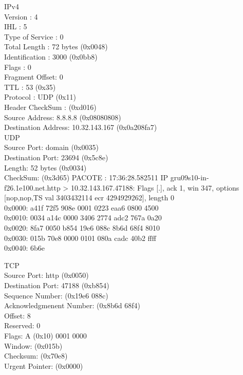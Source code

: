 \documentclass[12pt]{article}
\begin{document}
IPv4 \\
Version : 4 \\
IHL : 5 \\
Type of Service : 0 \\
Total Length : 72 bytes (0x0048) \\
Identification : 3000 (0x0bb8) \\
Flags : 0 \\ 
Fragment Offset: 0 \\
TTL : 53 (0x35) \\
Protocol : UDP (0x11) \\
Header CheckSum : (0xd016) \\
Source Address: 8.8.8.8 (0x08080808) \\ 
Destination Address: 10.32.143.167 (0x0a208fa7) \\

UDP \\
Source Port: domain (0x0035) \\
Destination Port: 23694 (0x5c8e) \\
Length: 52 bytes (0x0034)  \\
CheckSum: (0x3d65) 
 \newpage
PACOTE : 17:36:28.582511 IP gru09s10-in-f26.1e100.net.http > 10.32.143.167.47188: Flags [.], ack 1, win 347, options [nop,nop,TS val 3403432114 ecr 4294929262], length 0 \\
0x0000:  a41f 72f5 908e 0001 0223 eaa6 0800 4500  \\
0x0010:  0034 a14c 0000 3406 2774 adc2 767a 0a20   \\
0x0020:  8fa7 0050 b854 19e6 088c 8b6d 68f4 8010  \\
0x0030:  015b 70e8 0000 0101 080a cadc 40b2 ffff   \\
0x0040:  6b6e  
	
TCP \\ 
Source Port: http (0x0050) \\
Destination Port: 47188 (0xb854) \\
Sequence Number: (0x19e6 088c) \\
Acknowledgmenent Number: (0x8b6d 68f4) \\
Offset: 8 \\
Reserved: 0 \\
Flags: A (0x10) 0001 0000 \\
Window: (0x015b) \\
Checksum: (0x70e8) \\
Urgent Pointer: (0x0000) \\
\end{document}
